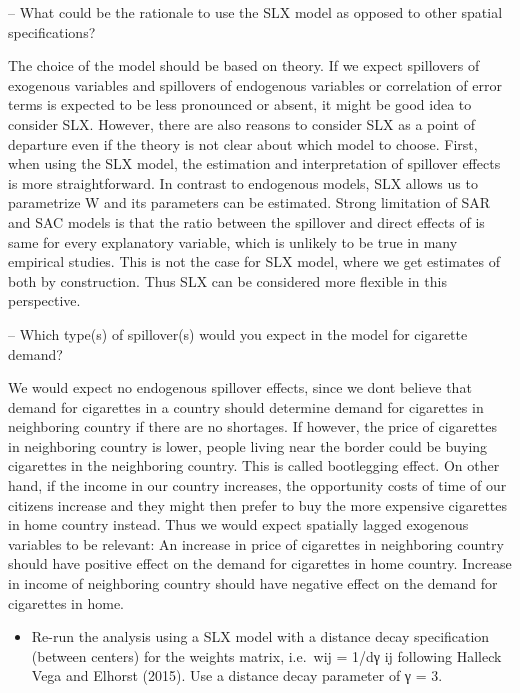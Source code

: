 \documentclass[
  a4paper,
]{article}
\providecommand{\tightlist}{%
  \setlength{\itemsep}{0pt}\setlength{\parskip}{0pt}}
\begin{document}
-- What could be the rationale to use the SLX model as opposed to other
spatial specifications?

The choice of the model should be based on theory. If we expect
spillovers of exogenous variables and spillovers of endogenous variables
or correlation of error terms is expected to be less pronounced or
absent, it might be good idea to consider SLX. However, there are also
reasons to consider SLX as a point of departure even if the theory is
not clear about which model to choose. First, when using the SLX model,
the estimation and interpretation of spillover effects is more
straightforward. In contrast to endogenous models, SLX allows us to
parametrize W and its parameters can be estimated. Strong limitation of
SAR and SAC models is that the ratio between the spillover and direct
effects of is same for every explanatory variable, which is unlikely to
be true in many empirical studies. This is not the case for SLX model,
where we get estimates of both by construction. Thus SLX can be
considered more flexible in this perspective.

-- Which type(s) of spillover(s) would you expect in the model for
cigarette demand?

We would expect no endogenous spillover effects, since we dont believe
that demand for cigarettes in a country should determine demand for
cigarettes in neighboring country if there are no shortages. If however,
the price of cigarettes in neighboring country is lower, people living
near the border could be buying cigarettes in the neighboring country.
This is called bootlegging effect. On other hand, if the income in our
country increases, the opportunity costs of time of our citizens
increase and they might then prefer to buy the more expensive cigarettes
in home country instead. Thus we would expect spatially lagged exogenous
variables to be relevant: An increase in price of cigarettes in
neighboring country should have positive effect on the demand for
cigarettes in home country. Increase in income of neighboring country
should have negative effect on the demand for cigarettes in home.

\begin{itemize}
\tightlist
\item
  Re-run the analysis using a SLX model with a distance decay
  specification (between centers) for the weights matrix, i.e.~wij =
  1/dγ ij following Halleck Vega and Elhorst (2015). Use a distance
  decay parameter of γ = 3.
\end{itemize}
\end{document}
